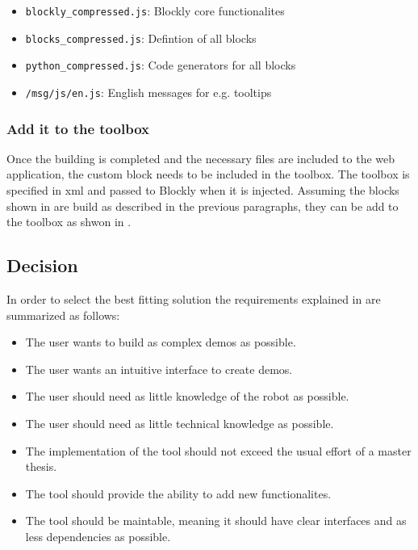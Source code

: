 \begin{itemize}
	\item \lstinline!blockly_compressed.js!: Blockly core functionalites
	\item \lstinline!blocks_compressed.js!: Defintion of all blocks
	\item \lstinline!python_compressed.js!: Code generators for all blocks
	\item \lstinline!/msg/js/en.js!: English messages for e.g. tooltips
\end{itemize}

\subsubsection{Add it to the toolbox}
Once the building is completed and the necessary files are included to the web application, the custom block needs to be included in the toolbox. The toolbox is specified in \gls{xml} and passed to Blockly when it is injected. Assuming the blocks shown in  are build as described in the previous paragraphs, they can be add to the toolbox as shwon in . \\

\begin{figure}[htbp]
	
\end{figure}

\subsection{Decision}
In order to select the best fitting solution the requirements explained in  are summarized as follows:

\begin{itemize}
	\item The user wants to build as complex demos as possible.
	\item The user wants an intuitive interface to create demos.
	\item The user should need as little knowledge of the robot as possible.
	\item The user should need as little technical knowledge as possible.
	\item The implementation of the tool should not exceed the usual effort of a master thesis.
	\item The tool should provide the ability to add new functionalites.
	\item The tool should be maintable, meaning it should have clear interfaces and as less dependencies as possible.
\end{itemize}

